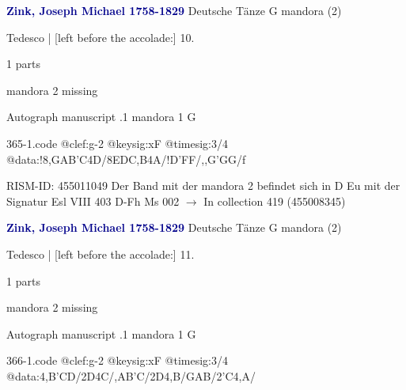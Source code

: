 \documentclass[twocolumn]{book}
\begin{document}
\newline \par \vspace{7pt} \textcolor{darkblue}{\textbf{Zink, Joseph Michael  1758-1829}}
\newline Deutsche Tänze  G  
\newline mandora (2)
\newline \begin{itshape}[f.9v, at left:] Tedesco | [left before the accolade:] 10.\end{itshape} 
\newline \textcolor{darkblue}{}  1 parts  
\newline \begin{small} mandora 2 missing\end{small} 
\newline Autograph manuscript
.1  mandora 1  G  
\begin{filecontents*}{365-1.code}
@clef:g-2
@keysig:xF
@timesig:3/4
@data:!{8,GAB'C}4D/{8EDC,B}4A/!D'FF/,,G'GG/f
\end{filecontents*}
\newline
%

\newline RISM-ID: 455011049
\newline Der Band mit der mandora 2 befindet sich in D Eu mit der Signatur Esl VIII 403
\newline D-Fh  Ms 002
\newline $\rightarrow$ In collection 419 (455008345)

\newline \par \vspace{7pt} \textcolor{darkblue}{\textbf{Zink, Joseph Michael  1758-1829}}
\newline Deutsche Tänze  G  
\newline mandora (2)
\newline \begin{itshape}[f.9v, at left:] Tedesco | [left before the accolade:] 11.\end{itshape} 
\newline \textcolor{darkblue}{}  1 parts  
\newline \begin{small} mandora 2 missing\end{small} 
\newline Autograph manuscript
.1  mandora 1  G  
\begin{filecontents*}{366-1.code}
@clef:g-2
@keysig:xF
@timesig:3/4
@data:4,B'CD/2D4C/,AB'C/2D4,B/GAB/2'C4,A/
\end{filecontents*}
\newline
%
\end{document}
